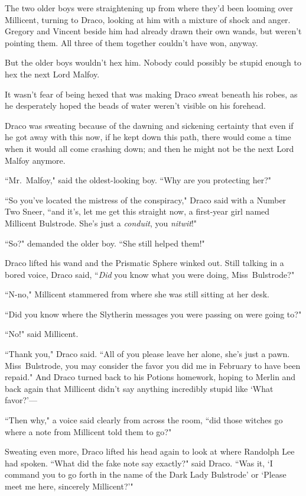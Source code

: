 The two older boys were straightening up from where they'd been looming over Millicent, turning to Draco, looking at him with a mixture of shock and anger. Gregory and Vincent beside him had already drawn their own wands, but weren't pointing them. All three of them together couldn't have won, anyway.

But the older boys wouldn't hex him. Nobody could possibly be stupid enough to hex the next Lord Malfoy.

It wasn't fear of being hexed that was making Draco sweat beneath his robes, as he desperately hoped the beads of water weren't visible on his forehead.

Draco was sweating because of the dawning and sickening certainty that even if he got away with this now, if he kept down this path, there would come a time when it would all come crashing down; and then he might not be the next Lord Malfoy anymore.

``Mr.~Malfoy," said the oldest-looking boy. ``Why are you protecting her?"

``So you've located the mistress of the conspiracy," Draco said with a Number Two Sneer, ``and it's, let me get this straight now, a first-year girl named Millicent Bulstrode. She's just a \emph{conduit}, you \emph{nitwit}!"

``So?" demanded the older boy. ``She still helped them!"

Draco lifted his wand and the Prismatic Sphere winked out. Still talking in a bored voice, Draco said, ``\emph{Did} you know what you were doing, Miss~Bulstrode?"

``N-no," Millicent stammered from where she was still sitting at her desk.

``Did you know where the Slytherin messages you were passing on were going to?"

``No!" said Millicent.

``Thank you," Draco said. ``All of you please leave her alone, she's just a pawn. Miss~Bulstrode, you may consider the favor you did me in February to have been repaid." And Draco turned back to his Potions homework, hoping to Merlin and back again that Millicent didn't say anything incredibly stupid like `What favor?'---

``Then why," a voice said clearly from across the room, ``did those witches go where a note from Millicent told them to go?"

Sweating even more, Draco lifted his head again to look at where Randolph Lee had spoken. ``What did the fake note say exactly?" said Draco. ``Was it, `I command you to go forth in the name of the Dark Lady Bulstrode' or `Please meet me here, sincerely Millicent?'"

